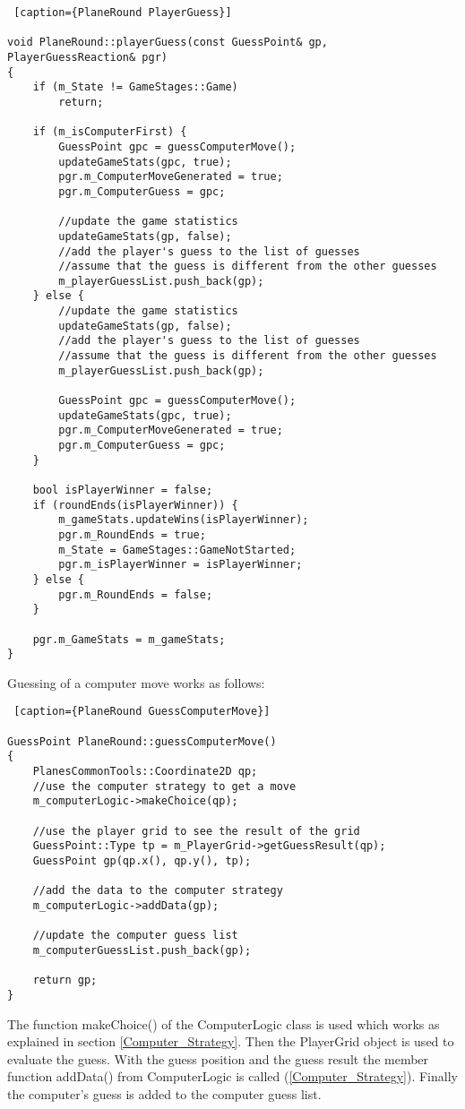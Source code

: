 \begin{lstlisting} [caption={PlaneRound PlayerGuess}]

void PlaneRound::playerGuess(const GuessPoint& gp, PlayerGuessReaction& pgr)
{
	if (m_State != GameStages::Game)
		return;

	if (m_isComputerFirst) {
		GuessPoint gpc = guessComputerMove();
		updateGameStats(gpc, true);
		pgr.m_ComputerMoveGenerated = true;
		pgr.m_ComputerGuess = gpc;
	
		//update the game statistics
		updateGameStats(gp, false);
		//add the player's guess to the list of guesses
		//assume that the guess is different from the other guesses
		m_playerGuessList.push_back(gp);
	} else {
		//update the game statistics
		updateGameStats(gp, false);
		//add the player's guess to the list of guesses
		//assume that the guess is different from the other guesses
		m_playerGuessList.push_back(gp);
		
		GuessPoint gpc = guessComputerMove();
		updateGameStats(gpc, true);
		pgr.m_ComputerMoveGenerated = true;
		pgr.m_ComputerGuess = gpc;
	}
	
	bool isPlayerWinner = false;
	if (roundEnds(isPlayerWinner)) {
		m_gameStats.updateWins(isPlayerWinner);
		pgr.m_RoundEnds = true;
		m_State = GameStages::GameNotStarted;
		pgr.m_isPlayerWinner = isPlayerWinner;
	} else {
		pgr.m_RoundEnds = false;
	}
	
	pgr.m_GameStats = m_gameStats;
}
\end{lstlisting}

Guessing of a computer move works as follows:

\begin{lstlisting} [caption={PlaneRound GuessComputerMove}]

GuessPoint PlaneRound::guessComputerMove()
{
	PlanesCommonTools::Coordinate2D qp;
	//use the computer strategy to get a move
	m_computerLogic->makeChoice(qp);
	
	//use the player grid to see the result of the grid
	GuessPoint::Type tp = m_PlayerGrid->getGuessResult(qp);
	GuessPoint gp(qp.x(), qp.y(), tp);
	
	//add the data to the computer strategy
	m_computerLogic->addData(gp);
	
	//update the computer guess list
	m_computerGuessList.push_back(gp);
	
	return gp;
}

\end{lstlisting}

The function makeChoice() of the ComputerLogic class is used which works as explained in section \ref{Computer_Strategy}. Then the PlayerGrid object is used to evaluate the guess. With the guess position and the guess result the member function addData() from ComputerLogic is called (\ref{Computer_Strategy}). Finally the computer's guess is added to the computer guess list. 

